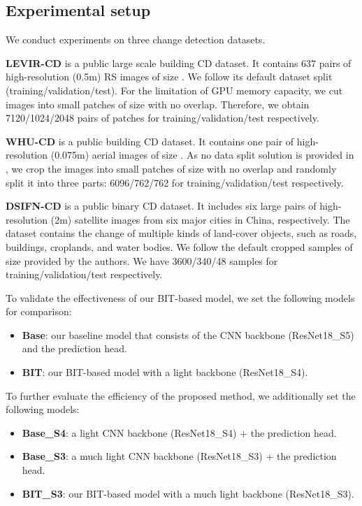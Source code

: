 \documentclass[journal]{IEEEtran}
\begin{document}
\subsection{Experimental setup}
\label{ssec:setup}

We conduct experiments on three change detection datasets.

\textbf{LEVIR-CD} \cite{Chen2020e} is a public large scale building CD dataset. It contains 637 pairs of high-resolution (0.5m) RS images of size . We follow its default dataset split (training/validation/test). For the limitation of GPU memory capacity, we cut images into small patches of size  with no overlap. Therefore, we obtain 7120/1024/2048 pairs of patches for training/validation/test respectively.

\textbf{WHU-CD} \cite{Ji2019a} is a public building CD dataset. It contains one pair of high-resolution (0.075m) aerial images of size . As no data split solution is provided in \cite{Ji2019a}, we crop the images into small patches of size  with no overlap and randomly split it into three parts: 6096/762/762 for training/validation/test respectively.

\textbf{DSIFN-CD} \cite{Zhang2020b} is a public binary CD dataset. It includes six large pairs of high-resolution (2m) satellite images from six major cities in China, respectively. The dataset contains the change of multiple kinds of land-cover objects, such as roads, buildings, croplands, and water bodies. We follow the default cropped samples of size  provided by the authors. We have 3600/340/48 samples for training/validation/test respectively.


To validate the effectiveness of our BIT-based model, we set the following models for comparison:

\begin{itemize}
    \item \textbf{Base}: our baseline model that consists of the CNN backbone (ResNet18\_S5) and the prediction head.
    \item \textbf{BIT}: our BIT-based model with a light backbone (ResNet18\_S4).
\end{itemize}

To further evaluate the efficiency of the proposed method, we additionally set the following models:
\begin{itemize}
    \item \textbf{Base\_S4}: a light CNN backbone (ResNet18\_S4) + the prediction head.
    \item \textbf{Base\_S3}: a much light CNN backbone (ResNet18\_S3) + the prediction head.
    \item \textbf{BIT\_S3}: our BIT-based model with a much light backbone (ResNet18\_S3).
\end{itemize}
\end{document}
